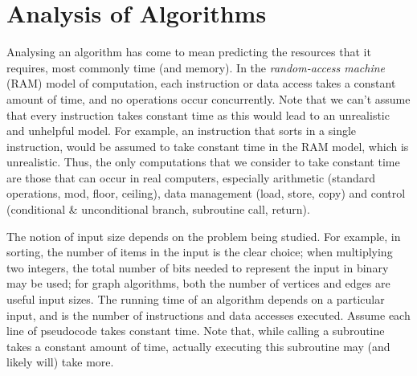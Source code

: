 \documentclass[12pt]{article}
\begin{document}
\section{Analysis of Algorithms}
Analysing an algorithm has come to mean predicting the resources that it requires, most commonly time (and memory). In the \textit{random-access
machine} (RAM) model of computation, each instruction or data access takes a constant amount of time, and
no operations occur concurrently. Note that we can't assume that every instruction takes constant time as this
would lead to an unrealistic and unhelpful model. For example, an instruction that sorts in a single instruction,
would be assumed to take constant time in the RAM model, which is unrealistic. Thus, the only computations that we consider
to take constant time are those that can occur in real computers, especially arithmetic (standard operations, mod, floor, ceiling), data
management (load, store, copy) and control (conditional \& unconditional branch, subroutine call, return).

The notion of input size depends on the problem being studied. For example, in sorting, the number of items in the input
is the clear choice; when multiplying two integers, the total number of bits needed to represent the input in binary
may be used; for graph algorithms, both the number of vertices and edges are useful input sizes. The running time of an
algorithm depends on a particular input, and is the number of instructions and data accesses executed. Assume each line of pseudocode takes
constant time. Note that, while calling a subroutine takes a constant amount of time, actually executing this subroutine may (and
likely will) take more.
\end{document}
